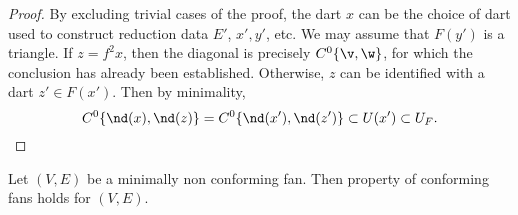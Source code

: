 \begin{proof}  
  By excluding trivial cases of the proof, the dart $x$ can be the
  choice of dart used to construct reduction data $E'$, $x',y'$, etc. We may
  assume that $F(y')$ is a triangle.  If $z=f^2x$, then the diagonal
  is precisely $C^0\{\v,\w\}$, for which the conclusion has already
  been established.  Otherwise, $z$ can be identified with a dart
  $z'\in F(x')$.  Then by minimality,
\begin{displaymath}
C^0\{\nd(x),\nd(z)\} = C^0\{\nd(x'),\nd(z')\} \subset U(x') \subset U_F.
\end{displaymath}
\end{proof}


\begin{lemma}[] Let $(V,E)$ be a minimally non
conforming fan.  Then property  of conforming fans
holds for $(V,E)$.
\end{lemma}
%

